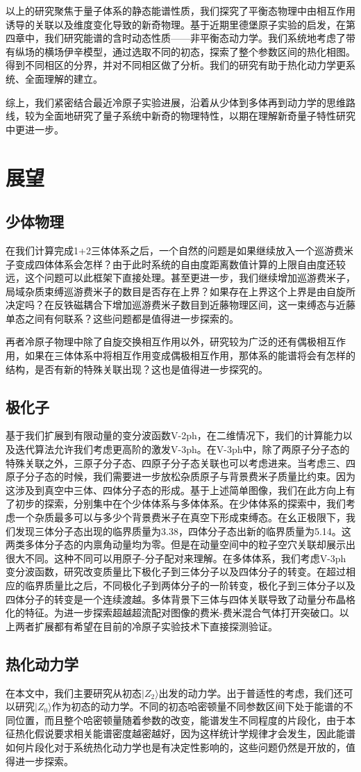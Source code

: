 以上的研究聚焦于量子体系的静态能谱性质，我们探究了平衡态物理中由相互作用诱导的关联以及维度变化导致的新奇物理。基于近期里德堡原子实验的启发，在第四章中，我们研究能谱的含时动态性质——非平衡态动力学。我们系统地考虑了带有纵场的横场伊辛模型，通过选取不同的初态，探索了整个参数区间的热化相图。得到不同相区的分界，并对不同相区做了分析。我们的研究有助于热化动力学更系统、全面理解的建立。

综上，我们紧密结合最近冷原子实验进展，沿着从少体到多体再到动力学的思维路线，较为全面地研究了量子系统中新奇的物理特性，以期在理解新奇量子特性研究中更进一步。


\section{展望}
\subsection{少体物理}
在我们计算完成1+2三体体系之后，一个自然的问题是如果继续放入一个巡游费米子变成四体体系会怎样？由于此时系统的自由度距离数值计算的上限自由度还较远，这个问题可以此框架下直接处理。甚至更进一步，我们继续增加巡游费米子，局域杂质束缚巡游费米子的数目是否存在上界？如果存在上界这个上界是由自旋所决定吗？在反铁磁耦合下增加巡游费米子数目到近藤物理区间，这一束缚态与近藤单态之间有何联系？这些问题都是值得进一步探索的。

再者冷原子物理中除了自旋交换相互作用以外，研究较为广泛的还有偶极相互作用，如果在三体体系中将相互作用变成偶极相互作用，那体系的能谱将会有怎样的结构，是否有新的特殊关联出现？这也是值得进一步探究的。

\subsection{极化子}
基于我们扩展到有限动量的变分波函数V-2ph，在二维情况下，我们的计算能力以及迭代算法允许我们考虑更高阶的激发V-3ph。在V-3ph中，除了两原子分子态的特殊关联之外，三原子分子态、四原子分子态关联也可以考虑进来。当考虑三、四原子分子态的时候，我们需要进一步放松杂质原子与背景费米子质量比约束。因为这涉及到真空中三体、四体分子态的形成。基于上述简单图像，我们在此方向上有了初步的探索，分别集中在个少体体系\cite{RuijinUniversal}与多体体系\cite{RuijinEmergence}。在少体体系的探索中，我们考虑一个杂质最多可以与多少个背景费米子在真空下形成束缚态。在幺正极限下，我们发现三体分子态出现的临界质量为3.38，四体分子态出新的临界质量为5.14。这两类多体分子态的内禀角动量均为零。但是在动量空间中的粒子空穴关联却展示出很大不同。这种不同可以用原子-分子配对来理解。在多体体系，我们考虑V-3ph变分波函数，研究改变质量比下极化子到三体分子以及四体分子的转变。在超过相应的临界质量比之后，不同极化子到两体分子的一阶转变，极化子到三体分子以及四体分子的转变是一个连续渡越。多体背景下三体与四体关联导致了动量分布晶格化的特征。为进一步探索超越超流配对图像的费米-费米混合气体打开突破口。以上两者扩展都有希望在目前的冷原子实验技术下直接探测验证。

\subsection{热化动力学}
在本文中，我们主要研究从初态$|Z_2\rangle$出发的动力学。出于普适性的考虑，我们还可以研究$|Z_0\rangle$作为初态的动力学。不同的初态哈密顿量不同参数区间下处于能谱的不同位置，而且整个哈密顿量随着参数的改变，能谱发生不同程度的片段化，由于本征热化假说要求相关能谱密度越密越好，因为这样统计学规律才会发生，因此能谱如何片段化对于系统热化动力学也是有决定性影响的，这些问题仍然是开放的，值得进一步探索。
